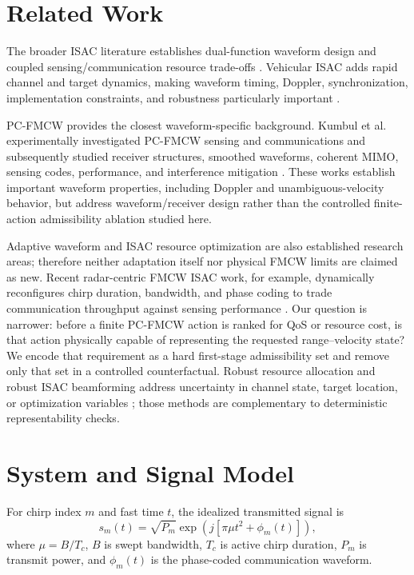 \documentclass[journal]{IEEEtran}
\begin{document}
\section{Related Work}
The broader ISAC literature establishes dual-function waveform design and coupled sensing/communication resource trade-offs \cite{liu2022isac,wang2022isac,wang2024isac}. Vehicular ISAC adds rapid channel and target dynamics, making waveform timing, Doppler, synchronization, implementation constraints, and robustness particularly important \cite{vehicular2022isac,ma2026vehicularisac}.

PC-FMCW provides the closest waveform-specific background. Kumbul et al. experimentally investigated PC-FMCW sensing and communications and subsequently studied receiver structures, smoothed waveforms, coherent MIMO, sensing codes, performance, and interference mitigation \cite{kumbul2021experimental,kumbul2022receiver,kumbul2022smoothed,kumbul2022codes,kumbul2023mimo,kumbul2023performance,kumbul2024interference}. These works establish important waveform properties, including Doppler and unambiguous-velocity behavior, but address waveform/receiver design rather than the controlled finite-action admissibility ablation studied here.

Adaptive waveform and ISAC resource optimization are also established research areas; therefore neither adaptation itself nor physical FMCW limits are claimed as new. Recent radar-centric FMCW ISAC work, for example, dynamically reconfigures chirp duration, bandwidth, and phase coding to trade communication throughput against sensing performance \cite{temiz2026adaptive}. Our question is narrower: before a finite PC-FMCW action is ranked for QoS or resource cost, is that action physically capable of representing the requested range--velocity state? We encode that requirement as a hard first-stage admissibility set and remove only that set in a controlled counterfactual. Robust resource allocation and robust ISAC beamforming address uncertainty in channel state, target location, or optimization variables \cite{wu2021robustv2x,lyu2024dualrobust}; those methods are complementary to deterministic representability checks.

\section{System and Signal Model}
For chirp index $m$ and fast time $t$, the idealized transmitted signal is
\begin{equation}
s_m(t)=\sqrt{P_m}\exp\left(j[\pi\mu t^2+\phi_m(t)]\right),
\end{equation}
where $\mu=B/T_c$, $B$ is swept bandwidth, $T_c$ is active chirp duration, $P_m$ is transmit power, and $\phi_m(t)$ is the phase-coded communication waveform.
\end{document}
